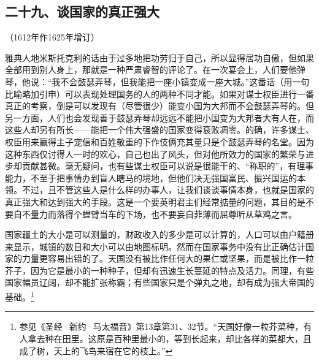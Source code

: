\subsection*{二十九、谈国家的真正强大}
\begin{center}
    （1612年作1625年增订）
\end{center}
\par 雅典人地米斯托克利的话由于过多地把功劳归于自己，所以显得居功自傲，但如果全部用到别人身上，那就是一种严肃睿智的评论了。在一次宴会上，人们要他弹琴，他说：“我不会鼓瑟弄琴，但我能把一座小镇变成一座大城。”这番话（用一句比喻略加引申）可以表现处理国务的人的两种不同才能。如果对谋士权臣进行一番真正的考察，倒是可以发现有（尽管很少）能变小国为大邦而不会鼓瑟弄琴的。但另一方面，人们也会发现善于鼓瑟弄琴却远远不能把小国变为大邦者大有人在，而这些人却另有所长——能把一个伟大强盛的国家变得衰败凋零。的确，许多谋士、权臣用来赢得主子宠信和百姓敬重的下作伎俩充其量只是个鼓瑟弄琴的名堂。因为这种东西仅讨得人一时的欢心，自己也出了风头，但对他所效力的国家的繁荣与进步却贡献甚微。毫无疑问，也有些谋士权臣可以说是很能干的、“称职的”，有理事能力，不至于把事情办到盲人瞎马的境地，但他们决无强国富民、振兴国运的本领。不过，且不管这些人是什么样的办事人，让我们谈谈事情本身，也就是国家的真正强大和达到强大的手段。这是一个要英明君主们经常掂量的问题，其目的是不要自不量力而落得个螳臂当车的下场，也不要妄自菲薄而屈尊听从草鸡之言。
\par 国家疆土的大小是可以测量的，财政收入的多少是可以计算的，人口可以由户籍册来显示，城镇的数目和大小可以由地图标明。然而在国家事务中没有比正确估计国家的力量更容易出错的了。天国没有被比作任何大的果仁或坚果，而是被比作一粒芥子，因为它是最小的一种种子，但却有迅速生长蔓延的特点及活力。同理，有些国家幅员辽阔，却不能扩张称霸；有些国家只是个弹丸之地，却有成为强大帝国的基础。\footnote{参见《圣经·新约·马太福音》第13章第31、32节。“天国好像一粒芥菜种，有人拿去种在田里。这原是百种里最小的，等到长起来，却比各样的菜都大，且成了树，天上的飞鸟来宿在它的枝上。”}
